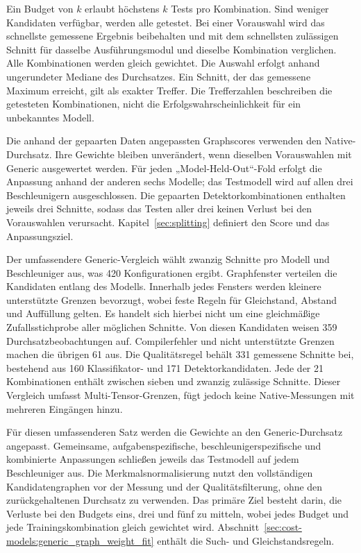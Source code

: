 Ein Budget von $k$ erlaubt höchstens $k$ Tests pro Kombination. Sind weniger Kandidaten verfügbar, werden alle getestet. Bei einer Vorauswahl wird das schnellste gemessene Ergebnis beibehalten und mit dem schnellsten zulässigen Schnitt für dasselbe Ausführungsmodul und dieselbe Kombination verglichen. Alle Kombinationen werden gleich gewichtet. Die Auswahl erfolgt anhand ungerundeter Mediane des Durchsatzes. Ein Schnitt, der das gemessene Maximum erreicht, gilt als exakter Treffer. Die Trefferzahlen beschreiben die getesteten Kombinationen, nicht die Erfolgswahrscheinlichkeit für ein unbekanntes Modell.

Die anhand der gepaarten Daten angepassten Graphscores verwenden den Native-Durchsatz. Ihre Gewichte bleiben unverändert, wenn dieselben Vorauswahlen mit Generic ausgewertet werden. Für jeden „Model-Held-Out“-Fold erfolgt die Anpassung anhand der anderen sechs Modelle; das Testmodell wird auf allen drei Beschleunigern ausgeschlossen. Die gepaarten Detektorkombinationen enthalten jeweils drei Schnitte, sodass das Testen aller drei keinen Verlust bei den Vorauswahlen verursacht. Kapitel~\ref{sec:splitting} definiert den Score und das Anpassungsziel.

Der umfassendere Generic-Vergleich wählt zwanzig Schnitte pro Modell und Beschleuniger aus, was 420 Konfigurationen ergibt. Graphfenster verteilen die Kandidaten entlang des Modells. Innerhalb jedes Fensters werden kleinere unterstützte Grenzen bevorzugt, wobei feste Regeln für Gleichstand, Abstand und Auffüllung gelten. Es handelt sich hierbei nicht um eine gleichmäßige Zufallsstichprobe aller möglichen Schnitte. Von diesen Kandidaten weisen 359 Durchsatzbeobachtungen auf. Compilerfehler und nicht unterstützte Grenzen machen die übrigen 61 aus. Die Qualitätsregel behält 331 gemessene Schnitte bei, bestehend aus 160 Klassifikator- und 171 Detektorkandidaten. Jede der 21 Kombinationen enthält zwischen sieben und zwanzig zulässige Schnitte. Dieser Vergleich umfasst Multi-Tensor-Grenzen, fügt jedoch keine Native-Messungen mit mehreren Eingängen hinzu.

Für diesen umfassenderen Satz werden die Gewichte an den Generic-Durchsatz angepasst. Gemeinsame, aufgabenspezifische, beschleunigerspezifische und kombinierte Anpassungen schließen jeweils das Testmodell auf jedem Beschleuniger aus. Die Merkmalsnormalisierung nutzt den vollständigen Kandidatengraphen vor der Messung und der Qualitätsfilterung, ohne den zurückgehaltenen Durchsatz zu verwenden. Das primäre Ziel besteht darin, die Verluste bei den Budgets eins, drei und fünf zu mitteln, wobei jedes Budget und jede Trainingskombination gleich gewichtet wird. Abschnitt~\ref{sec:cost-models:generic_graph_weight_fit} enthält die Such- und Gleichstandsregeln.

